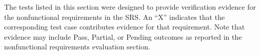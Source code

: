 \documentclass[12pt, titlepage]{article}
\begin{document}
\begin{table}[H]
\centering
\caption{Nonfunctional Requirements Traceability Matrix}
\label{tab:trace-nfr}
\end{table}

The tests listed in this section were designed to provide verification evidence
for the nonfunctional requirements in the SRS. An ``X'' indicates that the
corresponding test case contributes evidence for that requirement. Note that
evidence may include Pass, Partial, or Pending outcomes as reported in the
nonfunctional requirements evaluation section.
\end{document}
